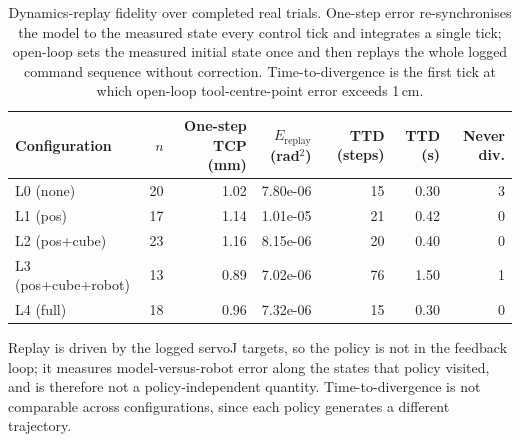 \begin{table}[h]
\centering
\caption{Dynamics-replay fidelity over completed real trials. One-step error re-synchronises the model to the measured state every control tick and integrates a single tick; open-loop sets the measured initial state once and then replays the whole logged command sequence without correction. Time-to-divergence is the first tick at which open-loop tool-centre-point error exceeds 1\,cm.}
\label{tab:replay}
\begin{tabular}{lrrrrrr}
\hline
\textbf{Configuration} & \textbf{$n$} & \textbf{One-step TCP (mm)} & \textbf{$E_{\mathrm{replay}}$ (rad$^2$)} & \textbf{TTD (steps)} & \textbf{TTD (s)} & \textbf{Never div.} \\
\hline
L0 (none) & 20 & 1.02 & 7.80e-06 & 15 & 0.30 & 3 \\
L1 (pos) & 17 & 1.14 & 1.01e-05 & 21 & 0.42 & 0 \\
L2 (pos+cube) & 23 & 1.16 & 8.15e-06 & 20 & 0.40 & 0 \\
L3 (pos+cube+robot) & 13 & 0.89 & 7.02e-06 & 76 & 1.50 & 1 \\
L4 (full) & 18 & 0.96 & 7.32e-06 & 15 & 0.30 & 0 \\
\hline
\end{tabular}

\vspace{2pt}
\begin{minipage}{0.95\linewidth}
\footnotesize Replay is driven by the logged servoJ targets, so the policy is not in the feedback loop; it measures model-versus-robot error along the states that policy visited, and is therefore not a policy-independent quantity. Time-to-divergence is not comparable across configurations, since each policy generates a different trajectory.
\end{minipage}
\end{table}
